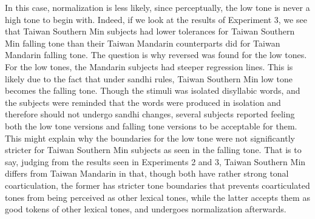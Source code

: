 In this case, normalization is less likely, since perceptually, the low tone is never a high tone to begin with. Indeed, if we look at the results of Experiment 3, we see that Taiwan Southern Min subjects had lower tolerances for Taiwan Southern Min falling tone than their Taiwan Mandarin counterparts did for Taiwan Mandarin falling tone. The question is why reversed was found for the low tones. For the low tones, the Mandarin subjects had steeper regression lines. This is likely due to the fact that under sandhi rules, Taiwan Southern Min low tone becomes the falling tone. Though the stimuli was isolated disyllabic words, and the subjects were reminded that the words were produced in isolation and therefore should not undergo sandhi changes, several subjects reported feeling both the low tone versions and falling tone versions to be acceptable for them. This might explain why the boundaries for the low tone were not significantly stricter for Taiwan Southern Min subjects as seen in the falling tone. That is to say, judging from the results seen in Experiments 2 and 3, Taiwan Southern Min differs from Taiwan Mandarin in that, though both have rather strong tonal coarticulation, the former has stricter tone boundaries that prevents coarticulated tones from being perceived as other lexical tones, while the latter accepts them as good tokens of other lexical tones, and undergoes normalization afterwards.

